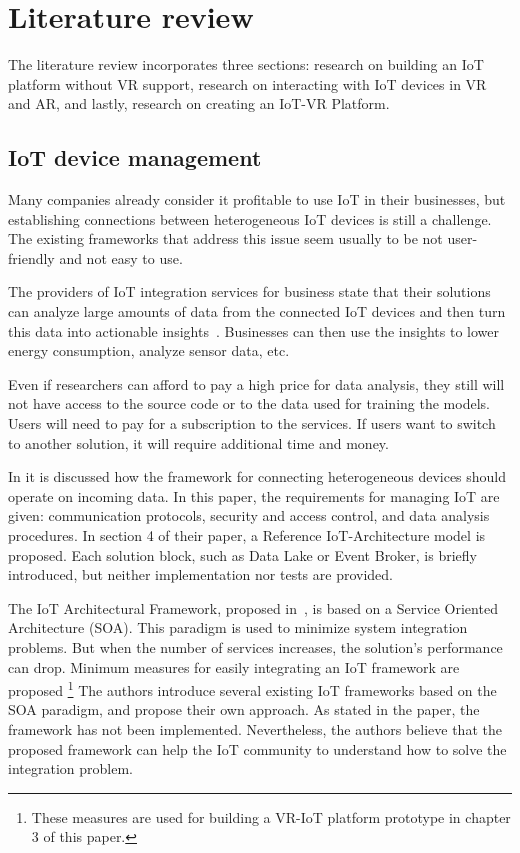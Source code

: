

\chapter{Literature review}

The literature review incorporates three sections: research on building an IoT platform without VR support, research on interacting with IoT devices in VR and AR, and lastly, research on creating an IoT-VR Platform.

\section{IoT device management}

Many companies already consider it profitable to use IoT in their businesses, but establishing connections between heterogeneous IoT devices is still a challenge. The existing frameworks that address this issue seem usually to be not user-friendly and not easy to use. 

The providers of IoT integration services for business state that their solutions can analyze large amounts of data from the connected IoT devices and then turn this data into actionable insights~\cite{software_ag_software_2020}. Businesses can then use the insights to lower energy consumption, analyze sensor data, etc.

Even if researchers can afford to pay a high price for data analysis, they still will not have access to the source code or to the data used for training the models. Users will need to pay for a subscription to the services. If users want to switch to another solution, it will require additional time and money.

In \cite{k_mohapatra_solution_2016} it is discussed how the framework for connecting heterogeneous devices should operate on incoming data. In this paper, the requirements for managing IoT are given: communication protocols, security and access control, and data analysis procedures. In section 4 of their paper, a Reference IoT-Architecture model is proposed. Each solution block, such as Data Lake or Event Broker, is briefly introduced, but neither implementation nor tests are provided.

The IoT Architectural Framework, proposed in~\cite{uviase_iot_2018}, is based on a Service Oriented Architecture (SOA). This paradigm is used to minimize system integration problems. But when the number of services increases, the solution's performance can drop. Minimum measures for easily integrating an IoT framework are proposed \footnote{These measures are used for building a VR-IoT platform prototype in chapter 3 of this paper.} The authors introduce several existing IoT frameworks based on the SOA paradigm, and propose their own approach. As stated in the paper, the framework has not been implemented.  Nevertheless, the authors believe that the proposed framework can help the IoT community to understand how to solve the integration problem.

